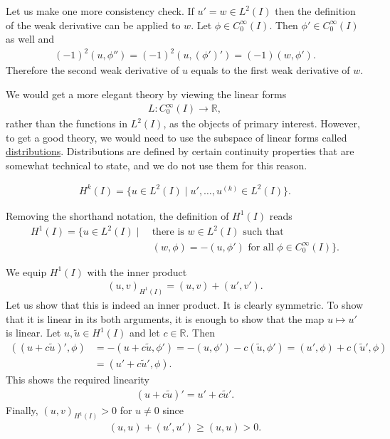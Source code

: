 \documentclass[12pt,oneside]{amsart}
\def\R{\mathbb R}
\begin{document}
Let us make one more consistency check. If $u' = w \in L^2(I)$
then the definition of the weak derivative can be applied to $w$.
Let $\phi \in C_0^\infty(I)$. Then $\phi' \in C_0^\infty(I)$ as well and 
    \begin{align*}
(-1)^2 (u, \phi'') = (-1)^2 (u, (\phi')') = (-1) (w, \phi').
    \end{align*}
Therefore the second weak derivative of $u$ equals to the first weak derivative of $w$.

We would get a more elegant theory by viewing the linear forms 
    \begin{align*}
L : C_0^\infty(I) \to \R,
    \end{align*}
rather than the functions in $L^2(I)$, as the objects of primary interest. However, to get a good theory, we would need to use the subspace of linear forms called 
\href{https://en.wikipedia.org/wiki/Distribution_(mathematics)}{distributions}. Distributions are defined by certain continuity properties that are somewhat technical to state, and we do not use them for this reason.  

\begin{definition}
    \begin{align*}
H^k(I) = \{ u \in L^2(I) \mid u', \dots, u^{(k)} \in L^2(I)\}.
    \end{align*}
\end{definition}

Removing the shorthand notation, the definition of $H^1(I)$ reads
    \begin{align*}
H^1(I) = \{ u \in L^2(I) \mid
\  
&\text{there is $w \in L^2(I)$ such that}
\\
&\text{$(w, \phi) = -(u, \phi')$ for all $\phi \in C_0^\infty(I)$}
\}.
    \end{align*}

We equip $H^1(I)$ with the inner product
    \begin{align*}
(u,v)_{H^1(I)} = (u,v) + (u', v').
    \end{align*}
Let us show that this is indeed an inner product.
It is clearly symmetric. 
To show that it is linear in its both arguments, it is enough to show that the map $u \mapsto u'$ is linear. Let $u, \tilde u \in H^1(I)$ and let $c \in \R$. Then 
    \begin{align*}
((u + c \tilde u)', \phi) 
&= 
-(u + c \tilde u, \phi')
= 
-(u, \phi') - c (\tilde u, \phi')
= 
(u', \phi) + c(\tilde u', \phi)
\\&=
(u' + c \tilde u', \phi).
    \end{align*}
This shows the required linearity 
    \begin{align}\label{eq_weakd_lin}
(u + c \tilde u)' = u' + c \tilde u'.
    \end{align}
Finally, $(u,v)_{H^1(I)}> 0$ for $u \ne 0$ since 
    \begin{align*}
(u,u) + (u', u') \ge (u, u) > 0.
    \end{align*}
\end{document}
